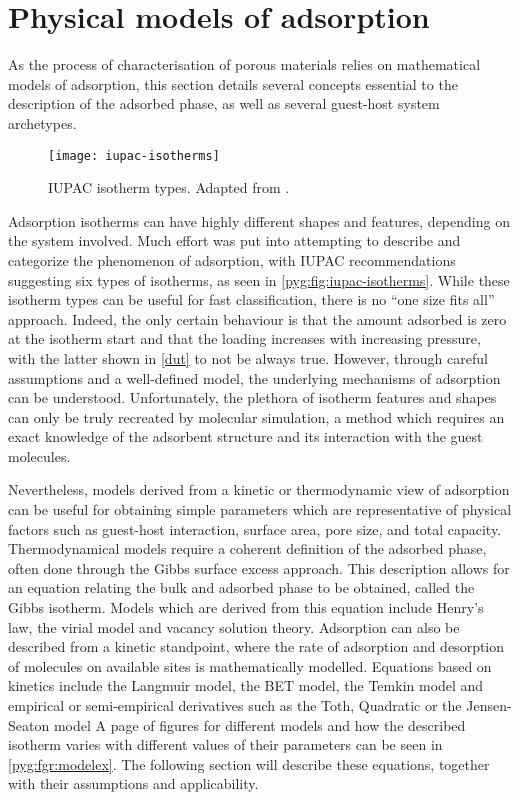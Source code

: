 
\section{Physical models of adsorption}%
\label{pyg:models}

As the process of characterisation of porous materials
relies on mathematical models of adsorption, this section 
details several concepts essential to the description of the 
adsorbed phase, as well as several guest-host system archetypes.

\begin{figure}[htb]
	\centering
	\texttt{[image: iupac-isotherms]}
	\caption{
		IUPAC isotherm types. 
		Adapted from \citet{rouquerolAdsorptionPowdersPorous2013}.
	}\label{pyg:fig:iupac-isotherms}
\end{figure}

Adsorption isotherms can have highly different shapes and features,
depending on the system involved. 
Much effort was put into attempting to describe and categorize
the phenomenon of adsorption, with IUPAC recommendations suggesting
six types of isotherms, as seen in \autoref{pyg:fig:iupac-isotherms}. 
While these isotherm types can be useful for fast classification, 
there is no ``one size fits all'' approach. Indeed, the only 
certain behaviour is that the amount adsorbed is zero at
the isotherm start and that the loading increases with increasing 
pressure, with the latter shown in \autoref{dut} to not be 
always true. However, through careful assumptions and a well-defined
model, the underlying mechanisms of adsorption can be understood.
Unfortunately, the plethora of isotherm features and shapes can only
be truly recreated by molecular simulation, a method which requires an
exact knowledge of the adsorbent structure and its interaction
with the guest molecules.

Nevertheless, models derived from a kinetic or thermodynamic
view of adsorption can be useful for obtaining simple parameters
which are representative of physical factors such as
guest-host interaction, surface area, pore size,
and total capacity. Thermodynamical models require a coherent
definition of the adsorbed phase, often done through the 
Gibbs surface excess approach. This description allows for an equation 
relating the bulk and adsorbed phase to be obtained, called
the Gibbs isotherm. Models which are derived from this equation include
Henry's law, the virial model and vacancy solution theory.
Adsorption can also be described from a kinetic standpoint, where
the rate of adsorption and desorption of molecules on
available sites is mathematically modelled. Equations based
on kinetics include the Langmuir model, the BET model,
the Temkin model and empirical or semi-empirical derivatives
such as the Toth, Quadratic or the Jensen-Seaton model
A page of figures for different models and how the
described isotherm varies with different values of
their parameters can be seen in
\autoref{pyg:fgr:modelex}. The following section will describe
these equations, together with their assumptions and
applicability.

